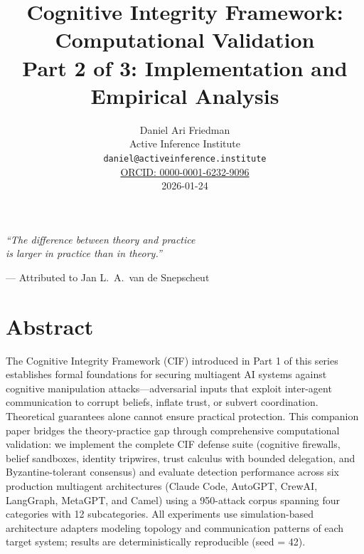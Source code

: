 \documentclass[
]{article}
\author{}
\date{}
\title{Cognitive Integrity Framework: Computational Validation\\\normalsize Part 2 of 3: Implementation and Empirical Analysis}
\author{Daniel Ari Friedman\\\footnotesize{Active Inference Institute}\\\footnotesize{\texttt{daniel@activeinference.institute}}\\\footnotesize{\href{https://orcid.org/0000-0001-6232-9096}{ORCID: 0000-0001-6232-9096}} \\ \footnotesize{2026-01-24}}
\begin{document}
\maketitle
\thispagestyle{empty}


\vspace*{2cm}

\begin{center}
\begin{minipage}{0.7\textwidth}
\centering
\Large\itshape
``The difference between theory and practice\\[0.3em]
is larger in practice than in theory.''
\vspace{1em}

\normalsize\upshape
--- Attributed to Jan L.\ A.\ van de Snepscheut
\end{minipage}
\end{center}

\vspace{2cm}

\section{Abstract}\label{abstract}

The Cognitive Integrity Framework (CIF) introduced in Part 1 of this
series establishes formal foundations for securing multiagent AI systems
against cognitive manipulation attacks---adversarial inputs that exploit
inter-agent communication to corrupt beliefs, inflate trust, or subvert
coordination. Theoretical guarantees alone cannot ensure practical
protection. This companion paper bridges the theory-practice gap through
comprehensive computational validation: we implement the complete CIF
defense suite (cognitive firewalls, belief sandboxes, identity
tripwires, trust calculus with bounded delegation, and
Byzantine-tolerant consensus) and evaluate detection performance across
six production multiagent architectures (Claude Code, AutoGPT, CrewAI,
LangGraph, MetaGPT, and Camel) using a 950-attack corpus spanning four
categories with 12 subcategories. All experiments use simulation-based
architecture adapters modeling topology and communication patterns of
each target system; results are deterministically reproducible (seed =
42).
\end{document}
